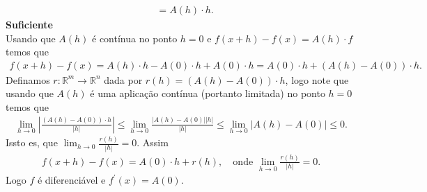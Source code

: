 \begin{homeworkProblem}[Seção 1-4]
\begin{solution}
\begin{align*}
      &=A(h)\cdot h.
    \end{align*}
  \textbf{Suficiente}\\
    Usando que $A(h)$ é contínua no ponto $h=0$ e $f(x+h)-f(x)=A(h)\cdot f$ temos que
    \begin{align*}
      f(x+h)-f(x)=A(h)\cdot h - A(0)\cdot h+A(0)\cdot h=A(0)\cdot h + \left( A(h)-A(0) \right)\cdot h.
    \end{align*}
    Definamos $r:\mathbb{R}^{m}\to\mathbb{R}^{n}$ dada por $r(h)=\left( A(h)-A(0) \right)\cdot h$, logo note que usando que $A(h)$ é uma aplicação contínua (portanto limitada) no ponto $h=0$ temos que 
    \begin{align*}
      \lim_{h \to 0}\left|\frac{\left( A(h)-A(0) \right)\cdot h}{|h|}\right|\leq \lim_{h \to 0}\frac{|A(h)-A(0)||h|}{|h|}\leq \lim_{h \to 0}|A(h)-A(0)|\leq 0.
    \end{align*}
    Issto es, que $\lim_{h \to 0}\frac{r(h)}{|h|}=0$. Assim
    \begin{align*}
      f(x+h)-f(x)=A(0)\cdot h+r(h),\quad\text{onde }\lim_{h \to 0}\frac{r(h)}{|h|}=0.
    \end{align*}
    Logo $f$ é diferenciável e $f^{\prime}(x)=A(0)$. 
  \end{solution}
\end{homeworkProblem}
